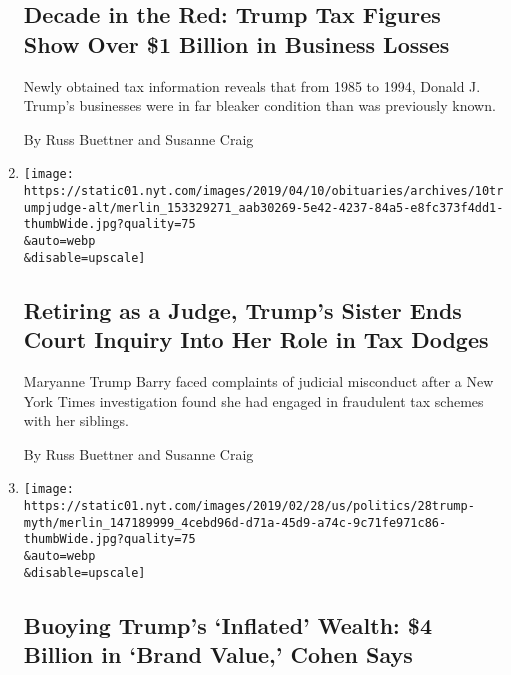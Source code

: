 \begin{enumerate}
  \hypertarget{decade-in-the-red-trump-tax-figures-show-over-1-billion-in-business-losses}{%
  \subsection{Decade in the Red: Trump Tax Figures Show Over \$1 Billion
  in Business
  Losses}\label{decade-in-the-red-trump-tax-figures-show-over-1-billion-in-business-losses}}

  Newly obtained tax information reveals that from 1985 to 1994, Donald
  J. Trump's businesses were in far bleaker condition than was
  previously known.

  By Russ Buettner and Susanne Craig
\item
  \href{/2019/04/10/us/maryanne-trump-barry-misconduct-inquiry.html}{}

  \texttt{[image: https://static01.nyt.com/images/2019/04/10/obituaries/archives/10trumpjudge-alt/merlin\_153329271\_aab30269-5e42-4237-84a5-e8fc373f4dd1-thumbWide.jpg?quality=75\\\&auto=webp\\\&disable=upscale]}

  \hypertarget{retiring-as-a-judge-trumps-sister-ends-court-inquiry-into-her-role-in-tax-dodges}{%
  \subsection{Retiring as a Judge, Trump's Sister Ends Court Inquiry
  Into Her Role in Tax
  Dodges}\label{retiring-as-a-judge-trumps-sister-ends-court-inquiry-into-her-role-in-tax-dodges}}

  Maryanne Trump Barry faced complaints of judicial misconduct after a
  New York Times investigation found she had engaged in fraudulent tax
  schemes with her siblings.

  By Russ Buettner and Susanne Craig
\item
  \href{/2019/02/27/us/politics/donald-trump-wealth.html}{}

  \texttt{[image: https://static01.nyt.com/images/2019/02/28/us/politics/28trump-myth/merlin\_147189999\_4cebd96d-d71a-45d9-a74c-9c71fe971c86-thumbWide.jpg?quality=75\\\&auto=webp\\\&disable=upscale]}

  \hypertarget{buoying-trumps-inflated-wealth-4-billion-in-brand-value-cohen-says}{%
  \subsection{Buoying Trump's `Inflated' Wealth: \$4 Billion in `Brand
  Value,' Cohen
  Says}\label{buoying-trumps-inflated-wealth-4-billion-in-brand-value-cohen-says}}


\end{enumerate}
